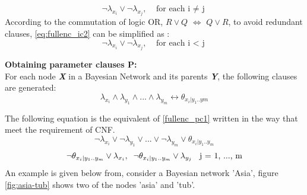             \begin{equation}\label{eq:fullenc_ic2}
                \neg\lambda_{x_{i}} \vee \neg\lambda_{x_{j}}, \;\;\; \mbox{for each i $\neq$ j}
            \end{equation}
            According to the commutation of logic OR, $R \vee Q$ $\Longleftrightarrow$ $Q \vee R$, to avoid redundant clauses, \ref{eq:fullenc_ic2} can be simplified as :
            \begin{equation}\label{fullenc_ic3}
                \neg\lambda_{x_{i}} \vee \neg\lambda_{x_{j}}, \;\;\; \mbox{for each i $<$ j}
            \end{equation}
            
            \textbf{Obtaining parameter clauses \textsc{P}:}\\
            For each node \textbf{\textit{X}} in a Bayesian Network and its parents \textbf{\textit{Y}}, the following clauses are generated:
            \begin{equation}\label{fullenc_pc1}
                \lambda_{x_{i}} \wedge \lambda_{y_{1}} \wedge... \wedge \lambda_{y_{m}} \leftrightarrow \theta_{x_{i}|y_{1}..y{m}}
            \end{equation}
            
            The following equation is the equivalent of \ref{fullenc_pc1} written in the way that meet the requirement of CNF.
            \begin{equation}\label{fullenc_IP}
                \neg\lambda_{x_{i}} \vee \neg\lambda_{y_{1}} \vee... \vee \neg\lambda_{y_{m}} \vee \theta_{x_{i}|y_{1}..y_{m}}
            \end{equation}
            \begin{equation}\label{fullenc_PI}
                \neg\theta_{x_{i}|y_{1}..y_{m}} \vee \lambda_{x_{i}},\\ \;\;
                \neg\theta_{x_{i}|y_{1}..y_{m}} \vee \lambda_{y_{j}} \;\; \mbox{ j = 1, ..., m}
            \end{equation}
            An example is given below from, consider a Bayesian network 'Asia', figure \ref{fig:asia-tub} shows two of the nodes 'asia' and 'tub'.
            
